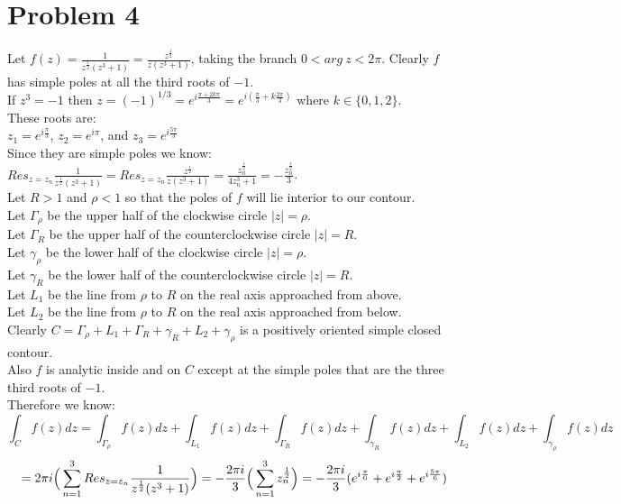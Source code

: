 \documentclass{article}
\begin{document}
\section*{Problem 4}
\begin{center}
    \doublespacing
    Let $f(z) =\frac{1}{z^{\frac{1}{2}}(z^3 + 1)} =\frac{z^{\frac{1}{2}}}{z(z^3 + 1)}$, taking the branch $0 < arg\:z < 2\pi$. Clearly $f$ has simple poles at all the third roots of $-1$.
    \\If $z^3 = -1$ then $z = (-1)^{1/3} = e^{i\frac{\pi + 2k\pi}{3}} = e^{i(\frac{\pi}{3} + k\frac{2\pi}{3})}$ where $k\in\{0, 1, 2\}$.
    \\These roots are:
    \\$z_1 = e^{i\frac{\pi}{3}}$, $z_2 = e^{i\pi}$, and $z_3 = e^{i\frac{5\pi}{3}}$
    \\Since they are simple poles we know:
    \\$Res_{z = z_n}\frac{1}{z^{\frac{1}{2}}(z^3 + 1)} = Res_{z = z_n}\frac{z^{\frac{1}{2}}}{z(z^3 + 1)} =\frac{z_n^{\frac{1}{2}}}{4z_n^3 + 1} = -\frac{z_n^{\frac{1}{2}}}{3}$.
    \\Let $R > 1$ and $\rho < 1$ so that the poles of $f$ will lie interior to our contour.
    \\Let $\Gamma _{\rho}$ be the upper half of the clockwise circle $|z| =\rho$.
    \\Let $\Gamma _R$ be the upper half of the counterclockwise circle $|z| = R$.
    \\Let $\gamma _{\rho}$ be the lower half of the clockwise circle $|z| =\rho$.
    \\Let $\gamma _R$ be the lower half of the counterclockwise circle $|z| = R$.
    \\Let $L_1$ be the line from $\rho$ to $R$ on the real axis approached from above.
    \\Let $L_2$ be the line from $\rho$ to $R$ on the real axis approached from below.
    \\Clearly $C =\Gamma _{\rho} + L_1 +\Gamma _R +\gamma _R + L_2 +\gamma _{\rho}$ is a positively oriented simple closed contour.
    \\Also $f$ is analytic inside and on $C$ except at the simple poles that are the three third roots of $-1$.
    \\Therefore we know:
    \[\int _C f(z) dz =\int _{\Gamma _{\rho}} f(z) dz +\int _{L_1} f(z) dz +\int _{\Gamma _R} f(z) dz +\int _{\gamma _R} f(z) dz +\int _{L_2} f(z) dz +\int _{\gamma _{\rho}} f(z) dz\]
    \[= 2\pi i\Big{(}\sum _{n=1}^3 Res_{z=z_n}\frac{1}{z^{\frac{1}{2}}(z^3 + 1)}\Big{)} = -\frac{2\pi i}{3}\Big{(}\sum _{n=1}^3 z_n^{\frac{1}{2}}\Big{)} = -\frac{2\pi i}{3} (e^{i\frac{\pi}{6}} + e^{i\frac{\pi}{2}} + e^{i\frac{5\pi}{6}})\]

\end{center}
\end{document}
